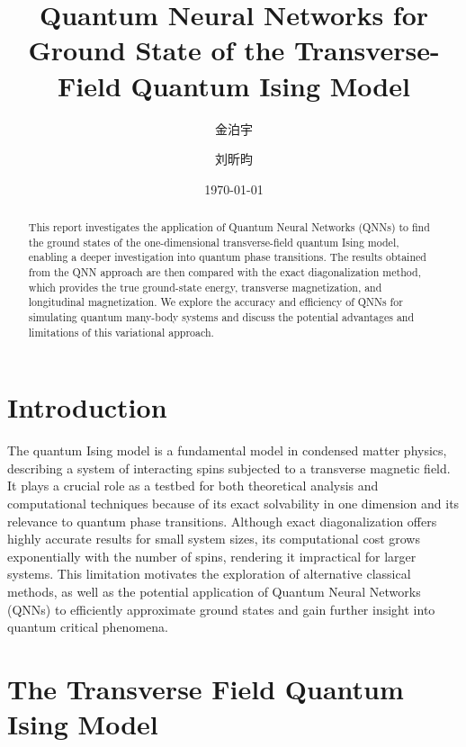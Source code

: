 \documentclass[pre,twocolumn,floatfix]{revtex4-1}
\begin{document}
\title{Quantum Neural Networks for Ground State of the Transverse-Field Quantum Ising Model}

\author{金泊宇}

\author{刘昕昀}


\date{\today}

\begin{abstract}
This report investigates the application of Quantum Neural Networks (QNNs) to find the ground states of the one-dimensional transverse-field quantum Ising model, enabling a deeper investigation into quantum phase transitions. The results obtained from the QNN approach are then compared with the exact diagonalization method, which provides the true ground-state energy, transverse magnetization, and longitudinal magnetization. We explore the accuracy and efficiency of QNNs for simulating quantum many-body systems and discuss the potential advantages and limitations of this variational approach.
\end{abstract}

\maketitle


\section{Introduction} \label{1}%
The quantum Ising model is a fundamental model in condensed matter physics, describing a system of interacting spins subjected to a transverse magnetic field. It plays a crucial role as a testbed for both theoretical analysis and computational techniques because of its exact solvability in one dimension and its relevance to quantum phase transitions. Although exact diagonalization offers highly accurate results for small system sizes, its computational cost grows exponentially with the number of spins, rendering it impractical for larger systems. This limitation motivates the exploration of alternative classical methods, as well as the potential application of Quantum Neural Networks (QNNs) to efficiently approximate ground states and gain further insight into quantum critical phenomena.



\section{The Transverse Field Quantum Ising Model}
\end{document}
